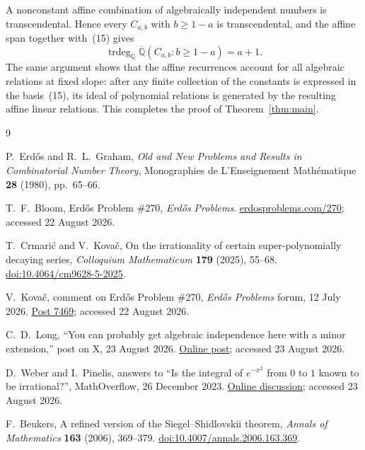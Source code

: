 \documentclass[12pt]{article}
\begin{document}
A nonconstant affine combination of algebraically independent numbers is transcendental. Hence every $C_{a,b}$ with $b\geq1-a$ is transcendental, and the affine span together with~(15) gives
\[
\operatorname{trdeg}_{\overline{\mathbb Q}}
\overline{\mathbb Q}(C_{a,b}:b\geq1-a)=a+1.
\]
The same argument shows that the affine recurrences account for all algebraic relations at fixed slope: after any finite collection of the constants is expressed in the basis~(15), its ideal of polynomial relations is generated by the resulting affine linear relations. This completes the proof of Theorem~\ref{thm:main}.
\begin{thebibliography}{9}
\footnotesize
\raggedright
\setlength{\itemsep}{0pt}
\setlength{\parskip}{0pt}

P.~Erd\H{o}s and R.~L.~Graham, \emph{Old and New Problems and Results in Combinatorial Number Theory}, Monographies de L'Enseignement Math\'ematique \textbf{28} (1980), pp.~65--66.

T.~F.~Bloom, Erd\H{o}s Problem \#270, \emph{Erd\H{o}s Problems}. \href{https://www.erdosproblems.com/270}{erdosproblems.com/270}; accessed 22 August 2026.

T.~Crmari\'c and V.~Kova\v{c}, On the irrationality of certain super-polynomially decaying series, \emph{Colloquium Mathematicum} \textbf{179} (2025), 55--68. \href{https://doi.org/10.4064/cm9628-5-2025}{doi:10.4064/cm9628-5-2025}.

V.~Kova\v{c}, comment on Erd\H{o}s Problem \#270, \emph{Erd\H{o}s Problems} forum, 12 July 2026. \href{https://www.erdosproblems.com/forum/thread/270\#post-7469}{Post 7469}; accessed 22 August 2026.

C.~D.~Long, ``You can probably get algebraic independence here with a minor extension,'' post on X, 23 August 2026. \href{https://x.com/octonion/status/2091555025197662264}{Online post}; accessed 23 August 2026.

D.~Weber and I.~Pinelis, answers to ``Is the integral of $e^{-x^2}$ from $0$ to $1$ known to be irrational?'', MathOverflow, 26 December 2023. \href{https://mathoverflow.net/questions/461028/}{Online discussion}; accessed 23 August 2026.

F.~Beukers, A refined version of the Siegel--Shidlovskii theorem, \emph{Annals of Mathematics} \textbf{163} (2006), 369--379. \href{https://doi.org/10.4007/annals.2006.163.369}{doi:10.4007/annals.2006.163.369}.


\end{thebibliography}
\end{document}
